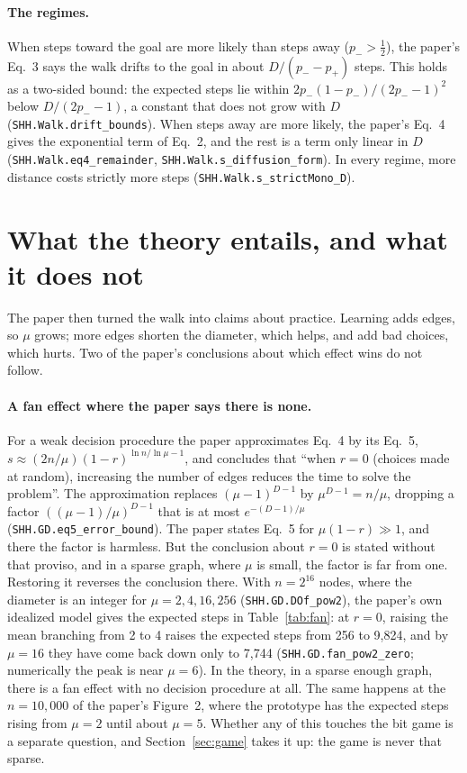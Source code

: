 \documentclass[11pt]{article}
\newcommand{\lean}[1]{\texttt{#1}}
\begin{document}
\paragraph{The regimes.} When steps toward the goal are more likely than
steps away ($p_- > \tfrac12$), the paper's Eq.~3 says the walk drifts to the
goal in about $D/(p_- - p_+)$ steps. This holds as a two-sided bound: the
expected steps lie within $2p_-(1-p_-)/(2p_- - 1)^2$ below $D/(2p_- - 1)$,
a constant that does not grow with $D$ (\lean{SHH.Walk.drift\_bounds}). When
steps away are more likely, the paper's Eq.~4 gives the exponential term of
Eq.~2, and the rest is a term only linear in $D$
(\lean{SHH.Walk.eq4\_remainder}, \lean{SHH.Walk.s\_diffusion\_form}). In
every regime, more distance costs strictly more steps
(\lean{SHH.Walk.s\_strictMono\_D}).

\section{What the theory entails, and what it does not}
\label{sec:entails}

The paper then turned the walk into claims about practice. Learning adds
edges, so $\mu$ grows; more edges shorten the diameter, which helps, and add
bad choices, which hurts. Two of the paper's conclusions about which effect
wins do not follow.

\paragraph{A fan effect where the paper says there is none.} For a weak
decision procedure the paper approximates Eq.~4 by its Eq.~5, $s \approx
(2n/\mu)(1-r)^{\ln n/\ln\mu - 1}$, and concludes that ``when $r = 0$
(choices made at random), increasing the number of edges reduces the time
to solve the problem''. The approximation replaces $(\mu-1)^{D-1}$ by
$\mu^{D-1} = n/\mu$, dropping a factor $((\mu-1)/\mu)^{D-1}$ that is at most
$e^{-(D-1)/\mu}$ (\lean{SHH.GD.eq5\_error\_bound}). The paper states Eq.~5
for $\mu(1-r) \gg 1$, and there the factor is harmless. But the conclusion
about $r = 0$ is stated without that proviso, and in a sparse graph, where
$\mu$ is small, the factor is far from one. Restoring it reverses the
conclusion there. With $n = 2^{16}$ nodes, where the diameter is an
integer for $\mu = 2, 4, 16, 256$ (\lean{SHH.GD.DOf\_pow2}), the paper's
own idealized model gives the expected steps in Table~\ref{tab:fan}: at
$r = 0$, raising the mean branching from 2 to 4 raises the expected steps
from 256 to 9{,}824, and by $\mu = 16$ they have come back down only to
7{,}744 (\lean{SHH.GD.fan\_pow2\_zero}; numerically the peak is near
$\mu = 6$). In the theory, in a sparse enough graph, there is a fan effect
with no decision procedure at all. The same happens at the $n = 10{,}000$
of the paper's Figure~2, where the prototype has the expected steps rising
from $\mu = 2$ until about $\mu = 5$. Whether any of this touches the bit
game is a separate question, and Section~\ref{sec:game} takes it up: the
game is never that sparse.
\end{document}
